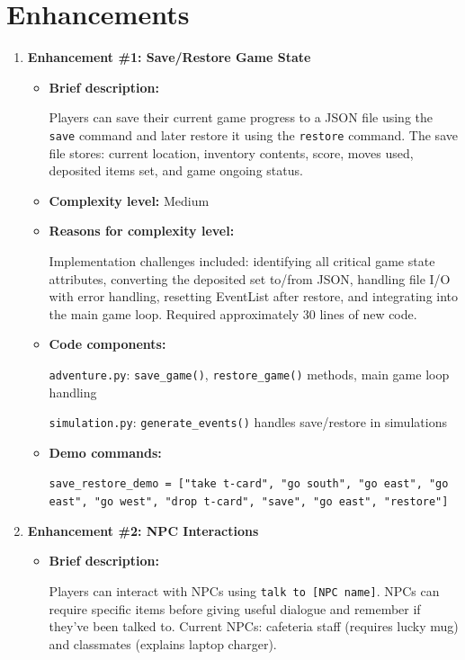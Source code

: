 \documentclass[11pt]{article}
\begin{document}
\section*{Enhancements}
\begin{enumerate}
    \item \textbf{Enhancement \#1: Save/Restore Game State}
    \begin{itemize}
        \item \textbf{Brief description:} 
        
        Players can save their current game progress to a JSON file using the \texttt{save} command and later restore it using the \texttt{restore} command. The save file stores: current location, inventory contents, score, moves used, deposited items set, and game ongoing status.
        
        \item \textbf{Complexity level:} Medium
        
        \item \textbf{Reasons for complexity level:}
        
        Implementation challenges included: identifying all critical game state attributes, converting the deposited set to/from JSON, handling file I/O with error handling, resetting EventList after restore, and integrating into the main game loop. Required approximately 30 lines of new code.
        
        \item \textbf{Code components:}
        
        \texttt{adventure.py}: \texttt{save\_game()}, \texttt{restore\_game()} methods, main game loop handling
        
        \texttt{simulation.py}: \texttt{generate\_events()} handles save/restore in simulations
        
        \item \textbf{Demo commands:}
        
        \texttt{save\_restore\_demo = ["take t-card", "go south", "go east", "go east", "go west", "drop t-card", "save", "go east", "restore"]}
    \end{itemize}

    \item \textbf{Enhancement \#2: NPC Interactions}
    \begin{itemize}
        \item \textbf{Brief description:}
        
        Players can interact with NPCs using \texttt{talk to [NPC name]}. NPCs can require specific items before giving useful dialogue and remember if they've been talked to. Current NPCs: cafeteria staff (requires lucky mug) and classmates (explains laptop charger).
        

\end{itemize}
\end{enumerate}
\end{document}

